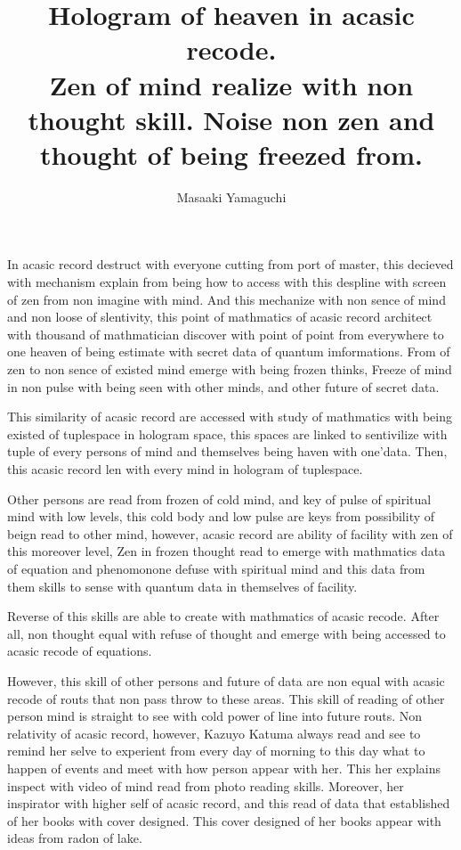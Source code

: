 \documentclass{jsarticle}
\begin{document}
\title{Hologram of heaven in acasic recode. \\
Zen of mind realize with non thought skill.
Noise non zen and thought of being freezed from.}
\author{Masaaki Yamaguchi}
\date{}
\maketitle



        In acasic record destruct with everyone cutting from port of master,
    this decieved with mechanism explain from being how to access
    with this despline with screen of zen from non imagine with mind.
    And this mechanize with non sence of mind and non loose of slentivity,
    this point of mathmatics of acasic record architect with thousand of
    mathmatician discover with point of point from everywhere to one heaven
    of being estimate with secret data of quantum imformations.
    From of zen to non sence of existed mind emerge with being frozen thinks,
    Freeze of mind in non pulse with being seen with other minds,
    and other future of secret data.

     
         This similarity of acasic record are accessed with study of mathmatics
    with being existed of tuplespace in hologram space,
    this spaces are linked to sentivilize with tuple of every persons of
    mind and themselves being haven with one'data.
    Then, this acasic record len with every mind in hologram of tuplespace.


         Other persons are read from frozen of cold mind, and key of pulse
    of spiritual mind with low levels, this cold body and low pulse are
    keys from possibility of beign read to other mind, however, 
    acasic record are ability of facility with zen of this moreover level,
    Zen in frozen thought read to emerge with mathmatics data of 
    equation and phenomonone defuse with spiritual mind and this data
    from them skills to sense with quantum data in themselves of facility.

    
         Reverse of this skills are able to create 
	 with mathmatics of acasic recode. After all, non thought 
	 equal with refuse of thought and emerge with being
    accessed to acasic recode of equations.


         However, this skill of other persons and 
	 future of data are non equal with
    acasic recode of routs that non pass throw to these areas.
    This skill of reading of other person mind is straight to see with
    cold power of line into future routs.
    Non relativity of acasic record, however, Kazuyo Katuma always read and see
    to remind her selve to experient from every day of morning to this day
    what to happen of events and meet with how person appear with
    her. This her explains inspect with video of mind read from photo reading
    skills.
    Moreover, her inspirator with higher self of acasic record, and this read
    of data that established of her books with cover designed.
    This cover designed of her books appear with ideas from radon of lake.
\end{document}
